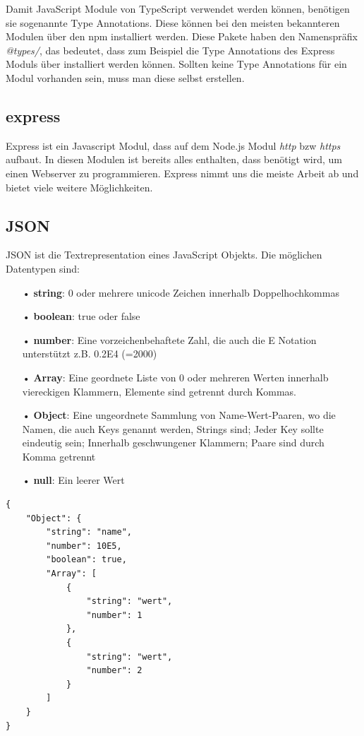 Damit JavaScript Module von TypeScript verwendet werden können, benötigen sie sogenannte Type Annotations. Diese können bei den meisten bekannteren Modulen über den \ac{npm} installiert werden. Diese Pakete haben den Namenspräfix \textit{@types/}, das bedeutet, dass zum Beispiel die Type Annotations des Express Moduls über  installiert werden können. Sollten keine Type Annotations für ein Modul vorhanden sein, muss man diese selbst erstellen.

\subsection{express}
\label{sec:vor-express}
Express ist ein Javascript Modul, dass auf dem Node.js Modul \textit{http} bzw \textit{https} aufbaut. In diesen Modulen ist bereits alles enthalten, dass benötigt wird, um einen Webserver zu programmieren. Express nimmt uns die meiste Arbeit ab und bietet viele weitere Möglichkeiten.

\subsection{JSON}
\label{sec:vor-json}
\ac{JSON} ist die Textrepresentation eines JavaScript Objekts. Die möglichen Datentypen sind:

\begin{itemize}
\item[•] \textbf{string}: 0 oder mehrere unicode Zeichen innerhalb Doppelhochkommas
\item[•] \textbf{boolean}: true oder false
\item[•] \textbf{number}: Eine vorzeichenbehaftete Zahl, die auch die E Notation unterstützt z.B. 0.2E4 (=2000)
\item[•] \textbf{Array}: Eine geordnete Liste von 0 oder mehreren Werten innerhalb viereckigen Klammern, Elemente sind getrennt durch Kommas.
\item[•] \textbf{Object}: Eine ungeordnete Sammlung von Name-Wert-Paaren, wo die Namen, die auch Keys genannt werden, Strings sind; Jeder Key sollte eindeutig sein; Innerhalb geschwungener Klammern; Paare sind durch Komma getrennt
\item[•] \textbf{null}: Ein leerer Wert
\end{itemize}

\begin{lstlisting}[style=JSON,caption=\ac{JSON} Beispiel]
{
	"Object": {	
		"string": "name",
		"number": 10E5,
		"boolean": true,
		"Array": [
			{
				"string": "wert",
				"number": 1
			},
			{
				"string": "wert",
				"number": 2
			}
		]
	}
}
\end{lstlisting}

